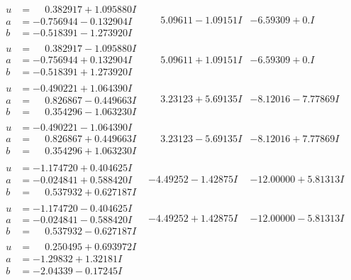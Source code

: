 \documentclass[1p]{elsarticle_modified}
\theoremstyle{definition}
\begin{document}
$$\begin{array}{c|c|c}
\begin{aligned}
u &= \phantom{-}0.382917 + 1.095880 I \\
a &= -0.756944 - 0.132904 I \\
b &= -0.518391 - 1.273920 I\end{aligned}
 & \phantom{-}5.09611 - 1.09151 I & -6.59309 + 0. I\phantom{ +0.000000I} \\ \hline\begin{aligned}
u &= \phantom{-}0.382917 - 1.095880 I \\
a &= -0.756944 + 0.132904 I \\
b &= -0.518391 + 1.273920 I\end{aligned}
 & \phantom{-}5.09611 + 1.09151 I & -6.59309 + 0. I\phantom{ +0.000000I} \\ \hline\begin{aligned}
u &= -0.490221 + 1.064390 I \\
a &= \phantom{-}0.826867 - 0.449663 I \\
b &= \phantom{-}0.354296 - 1.063230 I\end{aligned}
 & \phantom{-}3.23123 + 5.69135 I & -8.12016 - 7.77869 I \\ \hline\begin{aligned}
u &= -0.490221 - 1.064390 I \\
a &= \phantom{-}0.826867 + 0.449663 I \\
b &= \phantom{-}0.354296 + 1.063230 I\end{aligned}
 & \phantom{-}3.23123 - 5.69135 I & -8.12016 + 7.77869 I \\ \hline\begin{aligned}
u &= -1.174720 + 0.404625 I \\
a &= -0.024841 + 0.588420 I \\
b &= \phantom{-}0.537932 + 0.627187 I\end{aligned}
 & -4.49252 - 1.42875 I & -12.00000 + 5.81313 I \\ \hline\begin{aligned}
u &= -1.174720 - 0.404625 I \\
a &= -0.024841 - 0.588420 I \\
b &= \phantom{-}0.537932 - 0.627187 I\end{aligned}
 & -4.49252 + 1.42875 I & -12.00000 - 5.81313 I \\ \hline\begin{aligned}
u &= \phantom{-}0.250495 + 0.693972 I \\
a &= -1.29832 + 1.32181 I \\
b &= -2.04339 - 0.17245 I\end{aligned}

\end{array}$$
\end{document}

